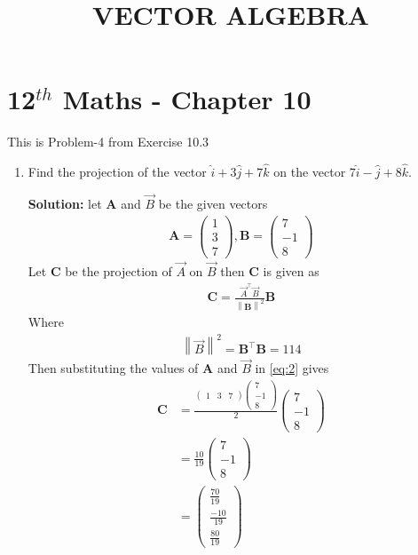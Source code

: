 \documentclass[12pt]{article}
\providecommand{\norm}[1]{\left\lVert#1\right\rVert}
\newcommand{\solution}{\noindent \textbf{Solution: }}
\newcommand{\myvec}[1]{\ensuremath{\begin{pmatrix}#1\end{pmatrix}}}
\let\vec\mathbf
\begin{document}
\begin{center}
\enlargethispage{-4cm}
\title{\textbf{VECTOR ALGEBRA}}
\date{\vspace{-5ex}} %
\maketitle
\end{center}
\setcounter{page}{1}
\section*{12$^{th}$ Maths - Chapter 10}
This is Problem-4 from Exercise 10.3
\begin{enumerate}
	\item Find the projection of the vector $\hat{i}+3\hat{j}+7\hat{k}$ on the vector $7\hat{i}-\hat{j}+8\hat{k}$.

\solution let $\vec{A}$ and $\Vec{B}$ be the given vectors
\begin{align}
 \vec{A} =\myvec{1\\3\\7},\vec{B} =\myvec{7\\-1\\8}
\end{align}
		Let $\vec{C}$ be the projection of $\Vec{A}$ on $\Vec{B}$ then $\vec{C}$ is given as
\begin{align}
	\vec{C}=\frac{\Vec{A}^\top \Vec{B}}{\norm{\vec{B}}^2}\vec{B}\label{eq:2}
\end{align}
Where 
\begin{align}
	\norm{\Vec{B}}^2=\vec{B}^\top\vec{B}=114
\end{align}
Then substituting the values of $\vec{A}$ and $\Vec{B}$ in \eqref{eq:2} gives
 \begin{align}
	 \vec{C} &=\frac{\myvec{1 & 3 & 7}\myvec{7\\-1\\8}}{2}\myvec{7\\-1\\8}\\
		&=\frac{10}{19}\myvec{7\\-1\\8}\\
		&=\myvec{\frac{70}{19}\\[2pt] \frac{-10}{19}\\[2pt] \frac{80}{19}}
 \end{align}
\end{enumerate}
\end{document}
